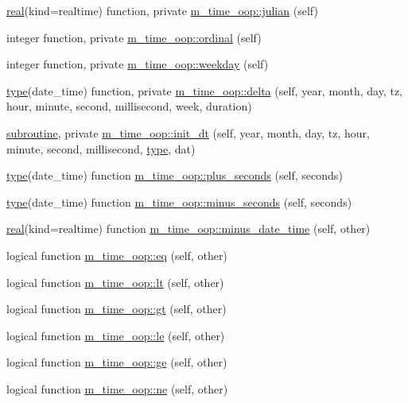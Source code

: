 \begin{DoxyCompactItemize}
\item 
\hyperlink{read__watch_83_8txt_abdb62bde002f38ef75f810d3a905a823}{real}(kind=realtime) function, private \hyperlink{namespacem__time__oop_ae7610f40e1528f79016de9ebbb3a3fd1}{m\+\_\+time\+\_\+oop\+::julian} (self)
\item 
integer function, private \hyperlink{namespacem__time__oop_a7845f6da505dff53007df45b5c198081}{m\+\_\+time\+\_\+oop\+::ordinal} (self)
\item 
integer function, private \hyperlink{namespacem__time__oop_ad290beea1dd0dc3d34486e8b4cd8a86c}{m\+\_\+time\+\_\+oop\+::weekday} (self)
\item 
\hyperlink{stop__watch_83_8txt_a70f0ead91c32e25323c03265aa302c1c}{type}(date\+\_\+time) function, private \hyperlink{namespacem__time__oop_aecd1edc1f6ca447d5381c8092eba7924}{m\+\_\+time\+\_\+oop\+::delta} (self, year, month, day, tz, hour, minute, second, millisecond, week, duration)
\item 
\hyperlink{M__stopwatch_83_8txt_acfbcff50169d691ff02d4a123ed70482}{subroutine}, private \hyperlink{namespacem__time__oop_ac81ff1eb27f637a60530d3c5d442fc71}{m\+\_\+time\+\_\+oop\+::init\+\_\+dt} (self, year, month, day, tz, hour, minute, second, millisecond, \hyperlink{stop__watch_83_8txt_a70f0ead91c32e25323c03265aa302c1c}{type}, dat)
\item 
\hyperlink{stop__watch_83_8txt_a70f0ead91c32e25323c03265aa302c1c}{type}(date\+\_\+time) function \hyperlink{namespacem__time__oop_a6830c1cce303ec401ac8e4333a5a73d4}{m\+\_\+time\+\_\+oop\+::plus\+\_\+seconds} (self, seconds)
\item 
\hyperlink{stop__watch_83_8txt_a70f0ead91c32e25323c03265aa302c1c}{type}(date\+\_\+time) function \hyperlink{namespacem__time__oop_a395fbf19c6617641aea39c33fd4b2087}{m\+\_\+time\+\_\+oop\+::minus\+\_\+seconds} (self, seconds)
\item 
\hyperlink{read__watch_83_8txt_abdb62bde002f38ef75f810d3a905a823}{real}(kind=realtime) function \hyperlink{namespacem__time__oop_a3da83a42a8f957db9bd2f6f0b942ab99}{m\+\_\+time\+\_\+oop\+::minus\+\_\+date\+\_\+time} (self, other)
\item 
logical function \hyperlink{namespacem__time__oop_afcc34853af3eda020eb5ff802e04964d}{m\+\_\+time\+\_\+oop\+::eq} (self, other)
\item 
logical function \hyperlink{namespacem__time__oop_ab0c5ce86d25993804501d59a8106818f}{m\+\_\+time\+\_\+oop\+::lt} (self, other)
\item 
logical function \hyperlink{namespacem__time__oop_a753692f18b6cd100401603d0b88d7c3c}{m\+\_\+time\+\_\+oop\+::gt} (self, other)
\item 
logical function \hyperlink{namespacem__time__oop_a5e04ff772ac6d72f68031ec43c1e6c84}{m\+\_\+time\+\_\+oop\+::le} (self, other)
\item 
logical function \hyperlink{namespacem__time__oop_aeea1131ab511b897168f00a908b75458}{m\+\_\+time\+\_\+oop\+::ge} (self, other)
\item 
logical function \hyperlink{namespacem__time__oop_a7707a7cbd4869301a613ceeb12ed2384}{m\+\_\+time\+\_\+oop\+::ne} (self, other)
\end{DoxyCompactItemize}
